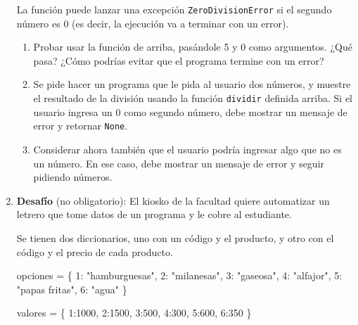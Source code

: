 \documentclass[
  letterpaper,
  DIV=11,
  numbers=noendperiod]{scrreprt}
\newenvironment{Shaded}{\begin{snugshade}}{\end{snugshade}}
\newcommand{\DecValTok}[1]{\textcolor[rgb]{0.68,0.00,0.00}{#1}}
\newcommand{\NormalTok}[1]{\textcolor[rgb]{0.00,0.23,0.31}{#1}}
\newcommand{\OperatorTok}[1]{\textcolor[rgb]{0.37,0.37,0.37}{#1}}
\newcommand{\StringTok}[1]{\textcolor[rgb]{0.13,0.47,0.30}{#1}}
\begin{document}
\begin{enumerate}
  La función puede lanzar una excepción \texttt{ZeroDivisionError} si el
  segundo número es 0 (es decir, la ejecución va a terminar con un
  error).

  \begin{enumerate}
  \def\labelenumii{\alph{enumii}.}
  \item
    Probar usar la función de arriba, pasándole 5 y 0 como argumentos.
    ¿Qué pasa? ¿Cómo podrías evitar que el programa termine con un
    error?
  \item
    Se pide hacer un programa que le pida al usuario dos números, y
    muestre el resultado de la división usando la función
    \texttt{dividir} definida arriba. Si el usuario ingresa un 0 como
    segundo número, debe mostrar un mensaje de error y retornar
    \texttt{None}.
  \item
    Considerar ahora también que el usuario podría ingresar algo que no
    es un número. En ese caso, debe mostrar un mensaje de error y seguir
    pidiendo números.
  \end{enumerate}
\item
  \textbf{Desafío} (no obligatorio): El kiosko de la facultad quiere
  automatizar un letrero que tome datos de un programa y le cobre al
  estudiante.

  Se tienen dos diccionarios, uno con un código y el producto, y otro
  con el código y el precio de cada producto.

\begin{Shaded}
\begin{Highlighting}[]
\NormalTok{opciones }\OperatorTok{=}\NormalTok{ \{}
    \DecValTok{1}\NormalTok{: }\StringTok{"hamburguesas"}\NormalTok{,}
    \DecValTok{2}\NormalTok{: }\StringTok{"milanesas"}\NormalTok{,}
    \DecValTok{3}\NormalTok{: }\StringTok{"gaseosa"}\NormalTok{,}
    \DecValTok{4}\NormalTok{: }\StringTok{"alfajor"}\NormalTok{,}
    \DecValTok{5}\NormalTok{: }\StringTok{"papas fritas"}\NormalTok{,}
    \DecValTok{6}\NormalTok{: }\StringTok{"agua"}
\NormalTok{\}}

\NormalTok{valores }\OperatorTok{=}\NormalTok{ \{}
    \DecValTok{1}\NormalTok{:}\DecValTok{1000}\NormalTok{,}
    \DecValTok{2}\NormalTok{:}\DecValTok{1500}\NormalTok{,}
    \DecValTok{3}\NormalTok{:}\DecValTok{500}\NormalTok{,}
    \DecValTok{4}\NormalTok{:}\DecValTok{300}\NormalTok{,}
    \DecValTok{5}\NormalTok{:}\DecValTok{600}\NormalTok{,}
    \DecValTok{6}\NormalTok{:}\DecValTok{350}
\NormalTok{\}}
\end{Highlighting}
\end{Shaded}


\end{enumerate}
\end{document}

